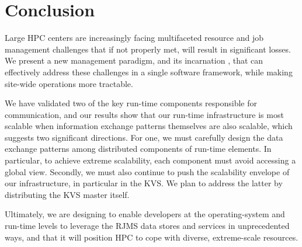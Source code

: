\section{Conclusion}
Large HPC centers are increasingly facing 
multifaceted resource and job management challenges
that if not properly met, will result 
in significant losses.  
We present a new management paradigm, and its incarnation \flux, that can effectively
address these challenges in a single software framework,
while making site-wide operations more tractable.

We have validated two of the key run-time components responsible for communication,
and our results show that our run-time 
infrastructure is most scalable when information 
exchange patterns themselves are also scalable, which suggests two significant directions. 
For one, we must carefully design the data exchange patterns
among distributed components of run-time elements. 
In particular, to achieve extreme scalability, each component 
must avoid accessing a global view.
Secondly, we must also continue to push the 
scalability envelope of our infrastructure, in particular in the
KVS. We plan to address the latter by 
distributing the KVS master itself.
%

Ultimately, we are designing \flux to  
enable developers at the operating-system and
run-time levels to leverage the RJMS data stores and services in
unprecedented ways, and that it will position HPC to cope
with diverse, extreme-scale resources.
